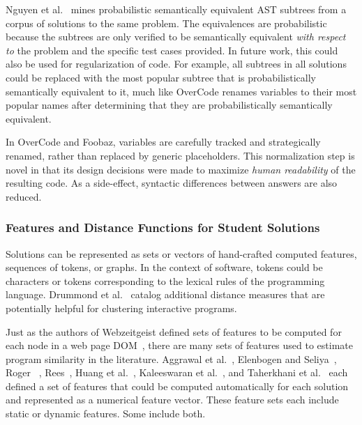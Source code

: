 Nguyen et al.~\cite{codewebs} mines probabilistic semantically equivalent AST subtrees from a corpus of solutions to the same problem. The equivalences are probabilistic because the subtrees are only verified to be semantically equivalent {\it with respect to} the problem and the specific test cases provided. In future work, this could also be used for regularization of code. For example, all subtrees in all solutions could be replaced with the most popular subtree that is probabilistically semantically equivalent to it, much like OverCode renames variables to their most popular names after determining that they are probabilistically semantically equivalent. 

In OverCode and Foobaz, variables are carefully tracked and strategically renamed, rather than replaced by generic placeholders. This normalization step is novel in that its design decisions were made to maximize {\it human readability} of the resulting code. As a side-effect, syntactic differences between answers are also reduced.

\subsubsection{Features and Distance Functions for Student Solutions}



Solutions can be represented as sets or vectors of hand-crafted computed features, sequences of tokens, or graphs. In the context of software, tokens could be characters or tokens corresponding to the lexical rules of the programming language. Drummond et al.~\cite{drummond2014learning} catalog additional distance measures that are potentially helpful for clustering interactive programs.


Just as the authors of Webzeitgeist defined sets of features to be computed for each node in a web page DOM~\cite{webzeitgeist}, there are many sets of features used to estimate program similarity in the literature. Aggrawal et al.~\cite{srikant2014system}, Elenbogen and Seliya~\cite{Elenbogen}, Roger ~\cite{ACESthesis}, Rees~\cite{Rees:1982}, Huang et al.~\cite{MOOCshop}, Kaleeswaran et al.~\cite{kaleeswaran2016semi}, and Taherkhani et al.~\cite{taherkhani2010recognizing} each defined a set of features that could be computed automatically for each solution and represented as a numerical feature vector. These feature sets each include static or dynamic features. Some include both.

